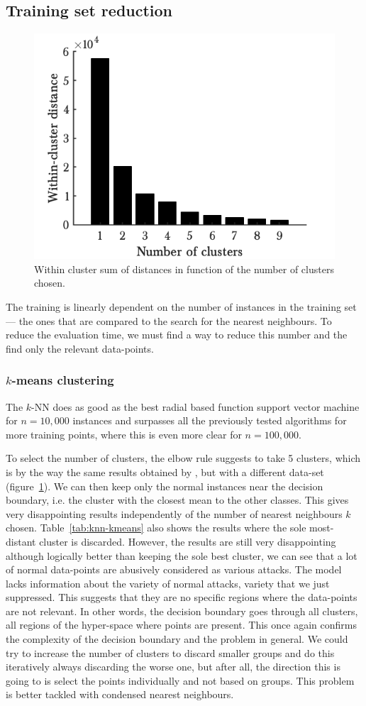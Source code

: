\subsection{Training set reduction}
\begin{figure}
\begin{center}
    \includegraphics[width=.45\textwidth]{parts/chap-4/img-knn/kmeans.png}
    \caption{Within cluster sum of distances in function of the number of clusters chosen.}
    \label{fig:kmeans}
\end{center}
\end{figure}
The training is linearly dependent on the number of instances in the training set --- the ones that are compared to the search for the nearest neighbours. To reduce the evaluation time, we must find a way to reduce this number and the find only the relevant data-points.

\subsubsection{$k$-means clustering}
The $k$-NN does as good as the best radial based function support vector machine for $n=10,000$ instances and surpasses all the previously tested algorithms for more training points, where this is even more clear for $n=100,000$.

To select the number of clusters, the elbow rule suggests to take 5 clusters, which is by the way the same results obtained by \cite{Soheily-Khah2018IntrusionDataset}, but with a different data-set (figure~\ref{fig:kmeans}). We can then keep only the normal instances near the decision boundary, i.e. the cluster with the closest mean to the other classes. This gives very disappointing results independently of the number of nearest neighbours $k$ chosen. Table~\ref{tab:knn-kmeans} also shows the results where the sole most-distant cluster is discarded. However, the results are still very disappointing although logically better than keeping the sole best cluster, we can see that a lot of normal data-points are abusively considered as various attacks. The model lacks information about the variety of normal attacks, variety that we just suppressed. This suggests that they are no specific regions where the data-points are not relevant. In other words, the decision boundary goes through all clusters, all regions of the hyper-space where points are present. This once again confirms the complexity of the decision boundary and the problem in general. We could try to increase the number of clusters to discard smaller groups and do this iteratively always discarding the worse one, but after all, the direction this is going to is select the points individually and not based on groups. This problem is better tackled with condensed nearest neighbours.

